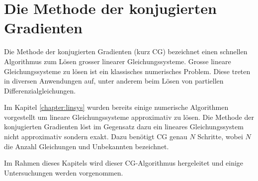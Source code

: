 %
%
%
\chapter{Die Methode der konjugierten Gradienten\label{chapter:cg}}
\begin{refsection}
%
%

Die Methode der konjugierten Gradienten (kurz CG) bezeichnet einen schnellen Algorithmus zum Lösen grosser linearer Gleichungssysteme.
Grosse lineare Gleichungssysteme zu lösen ist ein klassisches numerisches Problem.
Diese treten in diversen Anwendungen auf, unter anderem beim Lösen von partiellen Differenzialgleichungen.

Im Kapitel \ref{chapter:linsys} wurden bereits einige numerische Algorithmen vorgestellt um lineare Gleichungssysteme approximativ zu lösen.
Die Methode der konjugierten Gradienten löst im Gegensatz dazu ein lineares Gleichungssystem nicht approximativ sondern exakt.
Dazu benötigt CG genau $N$ Schritte, wobei $N$ die Anzahl Gleichungen und Unbekannten bezeichnet.

Im Rahmen dieses Kapitels wird dieser CG-Algorithmus hergeleitet und einige Untersuchungen werden vorgenommen.







\printbibliography[heading=subbibliography]
\end{refsection}
